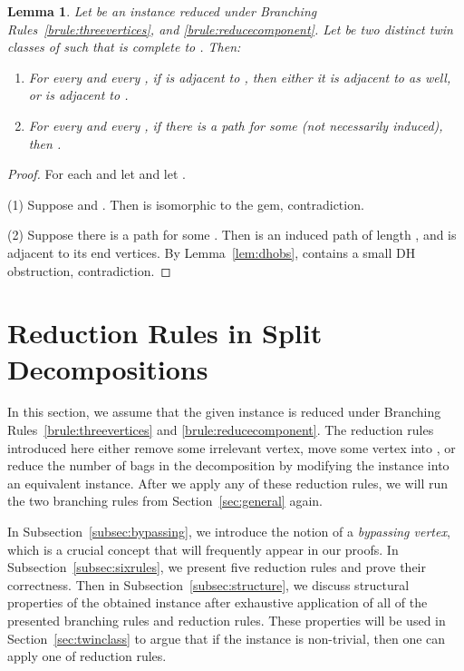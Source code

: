 \documentclass[11pt]{elsarticle}
\newtheorem{lemma}[theorem]{Lemma}
\begin{document}
\begin{lemma}\label{lem:completerelationt1t2}
 Let  be an instance reduced under Branching Rules~\ref{brule:threevertices}, and \ref{brule:reducecomponent}.
Let  be two distinct twin classes of  such that  is  complete to . Then:
\begin{enumerate}[(1)]
\item For every  and every , 
if  is adjacent to , then either it is adjacent to  as well, or  is adjacent to .
\item For every  and every , 
if there is a path  for some  (not necessarily induced), then .
\end{enumerate} 
 \end{lemma}
\begin{proof}
For each  and let  and let .

(1) Suppose  and .  Then  is isomorphic to the gem, contradiction.

(2) Suppose there is a path  for some .   
Then  is an induced path of length , and  is adjacent to its end vertices.
By Lemma~\ref{lem:dhobs}, 
 contains a small DH obstruction, contradiction.
\end{proof}




\section{Reduction Rules in Split Decompositions}\label{sec:rules}






   








In this section, we assume that the given instance  is reduced under Branching Rules~\ref{brule:threevertices} and \ref{brule:reducecomponent}.
The reduction rules introduced here either remove some irrelevant vertex, move some vertex into , or reduce the number of bags in the decomposition by modifying the instance into an equivalent instance.
After we apply any of these reduction rules, we will run the two branching rules from Section~\ref{sec:general} again.

In Subsection~\ref{subsec:bypassing}, we introduce the notion of a \emph{bypassing vertex}, which is a crucial concept that will frequently appear in our proofs.  
In Subsection~\ref{subsec:sixrules}, we present five reduction rules and prove their correctness.
Then in Subsection~\ref{subsec:structure}, we discuss structural properties of the obtained instance after exhaustive application of all of the presented branching rules and reduction rules.
These properties will be used in Section~\ref{sec:twinclass} to argue that if the instance is non-trivial, then one can apply one of reduction rules.
\end{document}
